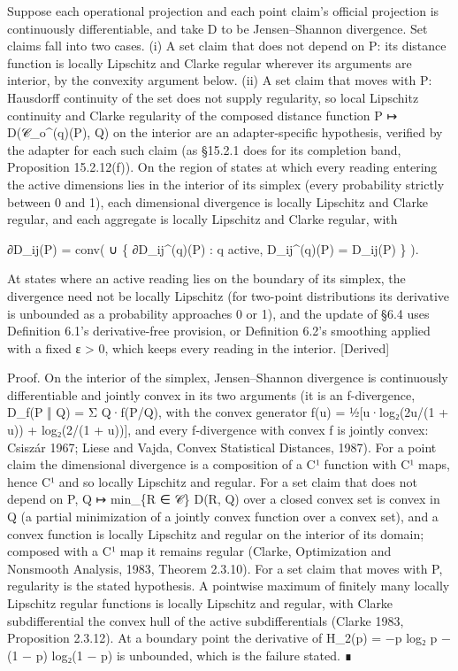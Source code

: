 \documentclass[
]{article}
\begin{document}
Suppose each operational projection and each point claim's official
projection is continuously differentiable, and take D to be
Jensen--Shannon divergence. Set claims fall into two cases. (i) A set
claim that does not depend on P: its distance function is locally
Lipschitz and Clarke regular wherever its arguments are interior, by the
convexity argument below. (ii) A set claim that moves with P: Hausdorff
continuity of the set does not supply regularity, so local Lipschitz
continuity and Clarke regularity of the composed distance function P ↦
D(𝒞\_o\^{}(q)(P), Q) on the interior are an adapter-specific hypothesis,
verified by the adapter for each such claim (as §15.2.1 does for its
completion band, Proposition 15.2.12(f)). On the region of states at
which every reading entering the active dimensions lies in the interior
of its simplex (every probability strictly between 0 and 1), each
dimensional divergence is locally Lipschitz and Clarke regular, and each
aggregate is locally Lipschitz and Clarke regular, with

∂D\_ij(P) = conv( ∪ \{ ∂D\_ij\^{}(q)(P) : q active, D\_ij\^{}(q)(P) =
D\_ij(P) \} ).

At states where an active reading lies on the boundary of its simplex,
the divergence need not be locally Lipschitz (for two-point
distributions its derivative is unbounded as a probability approaches 0
or 1), and the update of §6.4 uses Definition 6.1's derivative-free
provision, or Definition 6.2's smoothing applied with a fixed ε
\textgreater{} 0, which keeps every reading in the interior.
{[}Derived{]}

Proof. On the interior of the simplex, Jensen--Shannon divergence is
continuously differentiable and jointly convex in its two arguments (it
is an f-divergence, D\_f(P ‖ Q) = Σ Q·f(P/Q), with the convex generator
f(u) = ½{[}u·log₂(2u/(1 + u)) + log₂(2/(1 + u)){]}, and every
f-divergence with convex f is jointly convex: Csiszár 1967; Liese and
Vajda, Convex Statistical Distances, 1987). For a point claim the
dimensional divergence is a composition of a C¹ function with C¹ maps,
hence C¹ and so locally Lipschitz and regular. For a set claim that does
not depend on P, Q ↦ min\_\{R ∈ 𝒞\} D(R, Q) over a closed convex set is
convex in Q (a partial minimization of a jointly convex function over a
convex set), and a convex function is locally Lipschitz and regular on
the interior of its domain; composed with a C¹ map it remains regular
(Clarke, Optimization and Nonsmooth Analysis, 1983, Theorem 2.3.10). For
a set claim that moves with P, regularity is the stated hypothesis. A
pointwise maximum of finitely many locally Lipschitz regular functions
is locally Lipschitz and regular, with Clarke subdifferential the convex
hull of the active subdifferentials (Clarke 1983, Proposition 2.3.12).
At a boundary point the derivative of H\_2(p) = −p log₂ p − (1 − p)
log₂(1 − p) is unbounded, which is the failure stated. ∎
\end{document}
